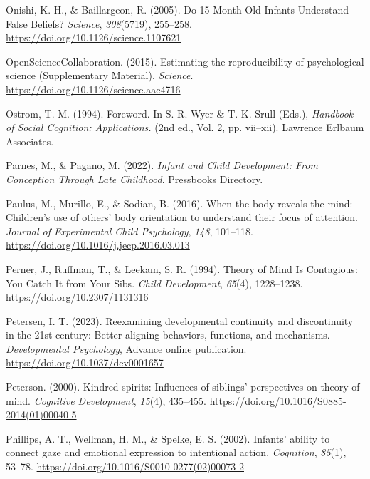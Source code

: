 \documentclass[
]{scrbook}
\newlength{\cslhangindent}
\newenvironment{CSLReferences}[2] %
 {\begin{list}{}{%
  \setlength{\itemindent}{0pt}
  \setlength{\leftmargin}{0pt}
  \setlength{\parsep}{0pt}
  \ifodd #1
   \setlength{\leftmargin}{\cslhangindent}
   \setlength{\itemindent}{-1\cslhangindent}
  \fi
  \setlength{\itemsep}{#2\baselineskip}}}
 {\end{list}}
\begin{document}
\begin{CSLReferences}{1}{0}
Onishi, K. H., \& Baillargeon, R. (2005). Do 15-{Month-Old Infants Understand False Beliefs}? \emph{Science}, \emph{308}(5719), 255--258. \url{https://doi.org/10.1126/science.1107621}

OpenScienceCollaboration. (2015). Estimating the reproducibility of psychological science ({Supplementary Material}). \emph{Science}. \url{https://doi.org/10.1126/science.aac4716}

Ostrom, T. M. (1994). Foreword. In S. R. Wyer \& T. K. Srull (Eds.), \emph{Handbook of {Social Cognition}: {Applications}.} (2nd ed., Vol. 2, pp. vii--xii). Lawrence Erlbaum Associates.

Parnes, M., \& Pagano, M. (2022). \emph{Infant and {Child Development}: {From Conception Through Late Childhood}}. Pressbooks Directory.

Paulus, M., Murillo, E., \& Sodian, B. (2016). When the body reveals the mind: {Children}'s use of others' body orientation to understand their focus of attention. \emph{Journal of Experimental Child Psychology}, \emph{148}, 101--118. \url{https://doi.org/10.1016/j.jecp.2016.03.013}

Perner, J., Ruffman, T., \& Leekam, S. R. (1994). Theory of {Mind Is Contagious}: {You Catch It} from {Your Sibs}. \emph{Child Development}, \emph{65}(4), 1228--1238. \url{https://doi.org/10.2307/1131316}

Petersen, I. T. (2023). Reexamining developmental continuity and discontinuity in the 21st century: {Better} aligning behaviors, functions, and mechanisms. \emph{Developmental Psychology}, Advance online publication. \url{https://doi.org/10.1037/dev0001657}

Peterson. (2000). Kindred spirits: {Influences} of siblings' perspectives on theory of mind. \emph{Cognitive Development}, \emph{15}(4), 435--455. \url{https://doi.org/10.1016/S0885-2014(01)00040-5}

Phillips, A. T., Wellman, H. M., \& Spelke, E. S. (2002). Infants' ability to connect gaze and emotional expression to intentional action. \emph{Cognition}, \emph{85}(1), 53--78. \url{https://doi.org/10.1016/S0010-0277(02)00073-2}


\end{CSLReferences}
\end{document}
